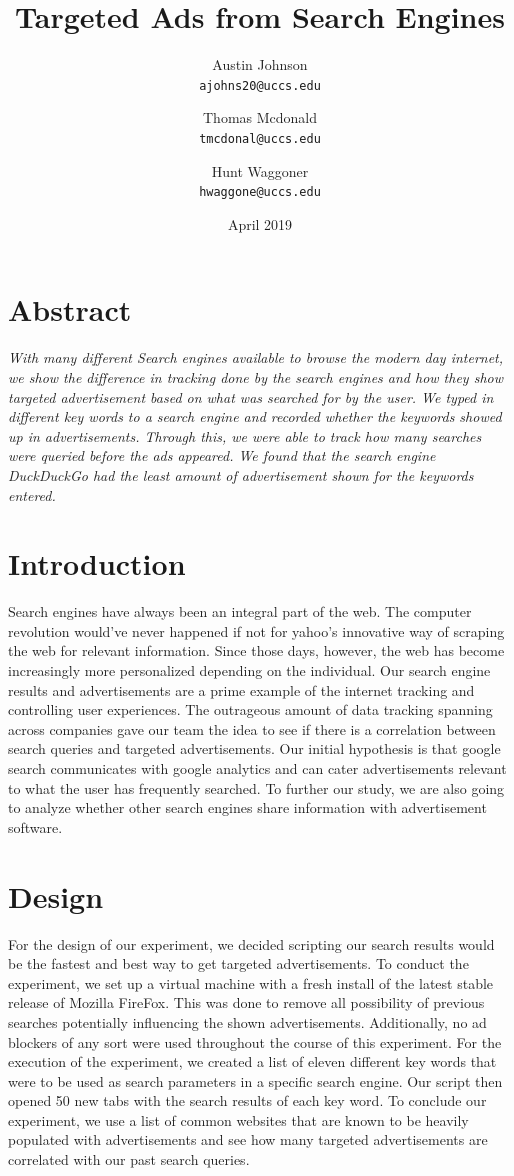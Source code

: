 \documentclass{article}
\author{Austin Johnson \\
\texttt{ajohns20@uccs.edu}
\and 
Thomas Mcdonald \\
\texttt{tmcdonal@uccs.edu}
\and 
Hunt Waggoner\\
\texttt{hwaggone@uccs.edu}
}
\title{Targeted Ads from Search Engines}
\date{April 2019}
\begin{document}
\maketitle


\section{Abstract}
\textit{
\qquad With many different Search engines available to browse the modern day internet, we show the difference in tracking done by the search engines and how they show targeted advertisement based on what was searched for by the user. We typed in different key words to a search engine and recorded whether the keywords showed up in advertisements. Through this, we were able to track how many searches were queried before the ads appeared. We found that the search engine DuckDuckGo had the least amount of advertisement shown for the keywords entered. }    

\section{Introduction}
\large

\qquad Search engines have always been an integral part of the web. The computer revolution would've never happened if not for yahoo's innovative way of scraping the web for relevant information. Since those days, however, the web has become increasingly more personalized depending on the individual. Our search engine results and advertisements are a prime example of the internet tracking and controlling user experiences. The outrageous amount of data tracking spanning across companies gave our team the idea to see if there is a correlation between search queries and targeted advertisements. Our initial hypothesis is that google search communicates with google analytics and can cater advertisements relevant to what the user has frequently searched. To further our study, we are also going to analyze whether other search engines share information with advertisement software.  


\section{Design}
\large
\qquad For the design of our experiment, we decided scripting our search results would be the fastest and best way to get targeted advertisements. To conduct the experiment, we set up a virtual machine with a fresh install of the latest stable release of Mozilla FireFox. This was done to remove all possibility of previous searches potentially influencing the shown advertisements. Additionally, no ad blockers of any sort were used throughout the course of this experiment.  For the execution of the experiment, we created a list of eleven different key words that were to be used as search parameters in a specific search engine. Our script then opened 50 new tabs with the search results of each key word. To conclude our experiment, we use a list of common websites that are known to be heavily populated with advertisements and see how many targeted advertisements are correlated with our past search queries. 
\end{document}
